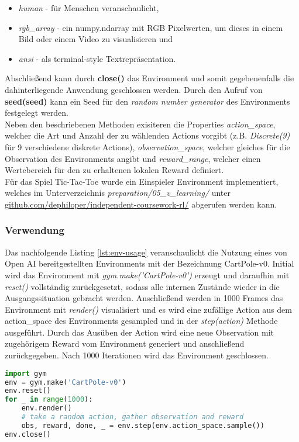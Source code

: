 \documentclass[11pt]{scrartcl}
\begin{document}
\begin{itemize}
\itemsep0pt
\item \textit{human} - für Menschen veranschaulicht, 
\item \textit{rgb\_array} - ein numpy.ndarray mit RGB Pixelwerten, um dieses in einem Bild oder einem 
Video zu visualisieren und 
\item \textit{ansi} - als terminal-style Textrepräsentation.
\end{itemize}
\noindent
Abschließend kann durch \textbf{close()} das Environment und somit gegebenenfalls die 
dahinterliegende Anwendung geschlossen werden. Durch den Aufruf von 
\textbf{seed(seed)} kann ein Seed für den \textit{random number generator}
des Environments festgelegt werden.\\
Neben den beschriebenen Methoden exisiteren die Properties \textit{action\_space}, welcher die
Art und Anzahl der zu wählenden Actions vorgibt (z.B. \textit{Discrete(9)} für 9 verschiedene
diskrete Actions), \textit{observation\_space}, welcher gleiches für die Observation des
Environments angibt und \textit{reward\_range}, welcher einen Wertebereich für den zu erhaltenen
lokalen Reward definiert.\\
Für das Spiel Tic-Tac-Toe wurde ein Einspieler Environment implementiert, welches im Unterverzeichnis
\textit{preparation/05\_v\_learning/} unter \url{github.com/dephiloper/independent-coursework-rl/}
abgerufen werden kann.  %


\subsubsection{Verwendung}
Das nachfolgende Listing \autoref{lst:env-usage} veranschaulicht die Nutzung eines von Open AI
bereitgestellten Environments mit der Bezeichnung CartPole-v0. Initial wird das Environment
mit \textit{gym.make('CartPole-v0')} erzeugt und daraufhin mit \textit{reset()} vollständig
zurückgesetzt, sodass alle internen Zustände wieder in die Ausgangssituation gebracht werden. 
Anschließend werden in 1000 Frames das Environment mit \textit{render()} visualisiert und es
wird eine zufällige Action aus dem action\_space des Environments gesampled und in der
\textit{step(action)} Methode ausgeführt. Durch das Ausüben der Action wird eine neue
Observation mit zugehörigem Reward vom Environment generiert und anschließend zurückgegeben.
Nach 1000 Iterationen wird das Environment geschlossen. 
\begin{lstlisting}[language=Python, caption=environment usage, label=lst:env-usage]
import gym
env = gym.make('CartPole-v0')
env.reset()
for _ in range(1000):
    env.render()
    # take a random action, gather observation and reward
    obs, reward, done, _ = env.step(env.action_space.sample())
env.close()
\end{lstlisting}
\end{document}
